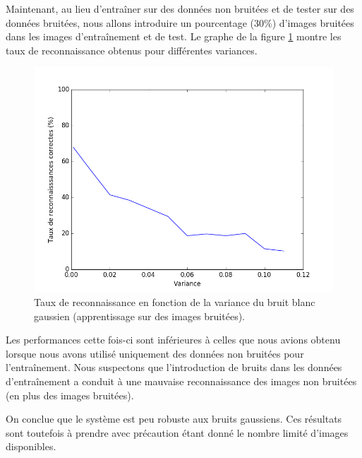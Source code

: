 Maintenant, au lieu d'entraîner sur des données non bruitées et de tester sur des 
données bruitées, nous allons introduire un pourcentage ($30\%$) d'images bruitées
dans les images d'entraînement et de test. Le graphe de la figure \ref{fig:robustness:gaussien:tout} 
montre les taux de reconnaissance obtenus pour différentes variances.
\begin{figure}[H]
    \centering
    \includegraphics[scale=0.5]{images/robustesse_gaussien_tout}
    \caption{Taux de reconnaissance en fonction de la variance du bruit blanc gaussien
    (apprentissage sur des images bruitées).}
    \label{fig:robustness:gaussien:tout}
\end{figure}
Les performances cette fois-ci sont inférieures à celles que nous avions obtenu lorsque nous
avons utilisé uniquement des données non bruitées pour l'entraînement. Nous suspectons que 
l'introduction de bruits dans les données d'entraînement a conduit à une mauvaise reconnaissance
des images non bruitées (en plus des images bruitées).

On conclue que le système est peu robuste aux bruits gaussiens. 
Ces résultats sont toutefois à prendre avec
précaution étant donné le nombre limité d'images disponibles.

